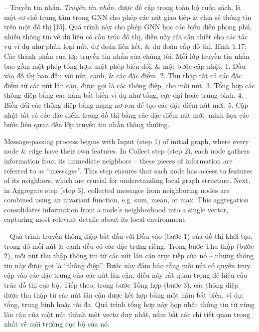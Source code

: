 \documentclass{article}
\begin{document}
\begin{itemize}
\begin{itemize}
\begin{itemize}
            -- {\sf Truyền tin nhắn.} {\it Truyền tin nhắn}, được đề cập trong toàn bộ cuốn sách, là một cơ chế trung tâm trong GNN cho phép các nút giao tiếp \& chia sẻ thông tin trên một đồ thị [15]. Quá trình này cho phép GNN học các biểu diễn phong phú, nhiều thông tin về dữ liệu có cấu trúc đồ thị, điều này rất cần thiết cho các tác vụ ví dụ như phân loại nút, dự đoán liên kết, \& dự đoán cấp đồ thị. {\sf Hình 1.17: Các thành phần của lớp truyền tin nhắn của chúng tôi. Mỗi lớp truyền tin nhắn bao gồm một phép tổng hợp, một phép biến đổi, \& một bước cập nhật: 1. Đầu vào đồ thị ban đầu với nút, cạnh, \& các đặc điểm. 2. Thu thập tất cả các đặc điểm từ các nút lân cận, được gọi là các thông điệp, cho mỗi nút. 3. Tổng hợp các thông điệp bằng các hàm bất biến ví dụ như tổng, cực đại hoặc trung bình. 4. Biến đổi các thông điệp bằng mạng nơ-ron để tạo các đặc điểm nút mới. 5. Cập nhật tất cả các đặc điểm trong đồ thị bằng các đặc điểm nút mới.} minh họa các bước liên quan đến lớp truyền tin nhắn thông thường.

            Message-passing process begins with Input (step 1) of initial graph, where every node \& edge have their own features. In Collect step (step 2), each node gathers information from its immediate neighbors -- these pieces of information are referred to as ``messages''. This step ensures that each node has access to features of its neighbors, which are crucial for understanding local graph structure. Next, in Aggregate step (step 3), collected messages from neighboring nodes are combined using an invariant function, e.g. sum, mean, or max. This aggregation consolidates information from a node's neighborhood into a single vector, capturing most relevant details about its local environment.

            -- Quá trình truyền thông điệp bắt đầu với Đầu vào (bước 1) của đồ thị khởi tạo, trong đó mỗi nút \& cạnh đều có các đặc trưng riêng. Trong bước Thu thập (bước 2), mỗi nút thu thập thông tin từ các nút lân cận trực tiếp của nó -- những thông tin này được gọi là ``thông điệp''. Bước này đảm bảo rằng mỗi nút có quyền truy cập vào các đặc trưng của các nút lân cận, điều này rất quan trọng để hiểu cấu trúc đồ thị cục bộ. Tiếp theo, trong bước Tổng hợp (bước 3), các thông điệp được thu thập từ các nút lân cận được kết hợp bằng một hàm bất biến, ví dụ: tổng, trung bình hoặc tối đa. Quá trình tổng hợp này hợp nhất thông tin từ vùng lân cận của một nút thành một vectơ duy nhất, nắm bắt các chi tiết quan trọng nhất về môi trường cục bộ của nó.


\end{itemize}
\end{itemize}
\end{itemize}
\end{document}
